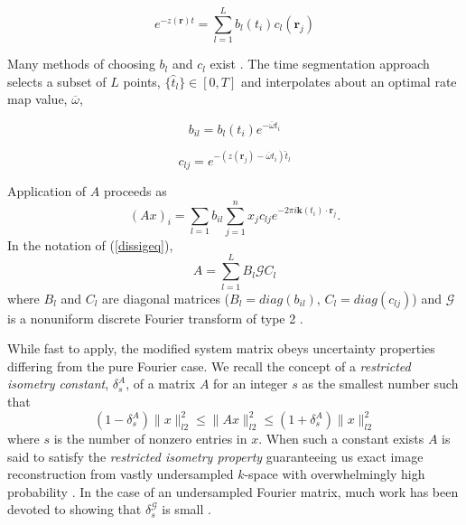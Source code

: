 \documentclass[11pt]{amsart}
\theoremstyle{remark}
\begin{document}
\begin{equation}
e^{-z(\mathbf{r})t} = \sum_{l=1}^L b_{l}(t_i)c_{l}(\mathbf{r}_j)
\end{equation}

Many methods of choosing $b_l$ and $c_l$ exist \cite{Man} \cite{Fessler2005}. The time segmentation approach \cite{Sutton2003} selects a subset of $L$ points, $\{ \hat{t}_l \} \in [0,T]$ and interpolates about an optimal rate map value, $\overline{\omega}$,

\begin{equation}
b_{il} = b_l(t_i)e^{-\overline{\omega}t_i}
\end{equation}

\begin{equation}
c_{lj} = e^{-(z(\mathbf{r}_j) - \overline{\omega}t_i)\hat{t}_l}
\end{equation}

Application of $A$ proceeds as
\begin{equation}
(Ax)_i = \sum_{l=1} b_{il} \sum_{j=1}^n x_j c_{lj} e^{-2\pi i \mathbf{k}(t_i) \cdot \mathbf{r}_j}.
\end{equation}
In the notation of (\ref{dissigeq}),
\begin{equation}\label{aprox}
A = \sum_{l=1}^L B_l \mathcal{G} C_l 
\end{equation}
where $B_l$ and $C_l$ are diagonal matrices ($B_l = diag (b_{il})$, $C_l = diag (c_{lj})$) and $\mathcal{G}$ is a nonuniform discrete Fourier transform of type 2 \cite{Greengard2004}.

While fast to apply, the modified system matrix obeys uncertainty properties differing from the pure Fourier case.
We recall the concept of a {\it restricted isometry constant}, $\delta_s^A$, of a matrix $A$ for an integer $s$ as the smallest number such that
\begin{equation}
(1-\delta_s^A)\|x\|_{l2}^2 \leq \|Ax\|_{l2}^2 \leq (1+\delta_s^A)\|x\|_{l2}^2
\end{equation}
where $s$ is the number of nonzero entries in $x$. When such a constant exists $A$ is said to satisfy the {\it restricted isometry property} guaranteeing us exact image reconstruction from vastly undersampled $k$-space with overwhelmingly high probability \cite{Donoho2004}. In the case of an undersampled Fourier matrix, much work has been devoted to showing that $\delta_s^{\mathcal{G}}$ is small \cite{Candes2006} \cite{Candes.2006}.
\end{document}
